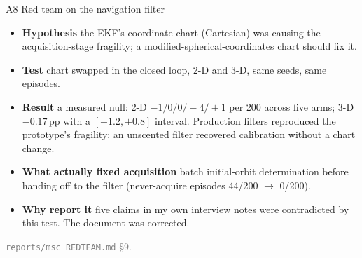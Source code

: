 \documentclass[aspectratio=169,11pt]{beamer}
\begin{document}
\begin{frame}{A8 \; Red team on the navigation filter}
\small
\begin{itemize}
  \item \textbf{Hypothesis} \; the EKF's coordinate chart (Cartesian) was causing the acquisition-stage fragility; a modified-spherical-coordinates chart should fix it.
  \item \textbf{Test} \; chart swapped in the closed loop, 2-D and 3-D, same seeds, same episodes.
  \item \textbf{Result} \; a measured null: 2-D $-1/0/0/-4/+1$ per 200 across five arms; 3-D $-0.17$\,pp with a $[-1.2,+0.8]$ interval. Production filters reproduced the prototype's fragility; an unscented filter recovered calibration without a chart change.
  \item \textbf{What actually fixed acquisition} \; batch initial-orbit determination before handing off to the filter (never-acquire episodes 44/200 $\to$ 0/200).
  \item \textbf{Why report it} \; five claims in my own interview notes were contradicted by this test. The document was corrected.
\end{itemize}
\vspace{2mm}
{\scriptsize\textcolor{grey}{\texttt{reports/msc\_REDTEAM.md} \S9.}}
\end{frame}
\end{document}
